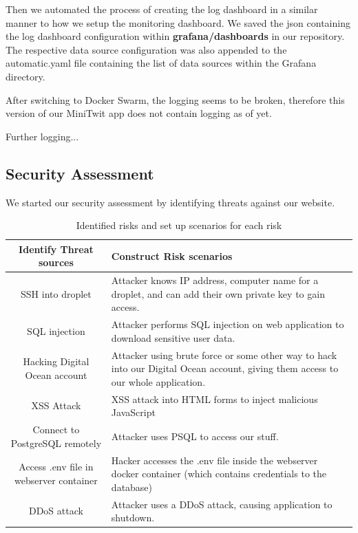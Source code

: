 Then we automated the process of creating the log dashboard in a similar manner to how we setup the monitoring dashboard. We saved the json containing the log dashboard configuration within \textbf{grafana/dashboards} in our repository. The respective data source configuration was also appended to the automatic.yaml file containing the list of data sources within the Grafana directory.

After switching to Docker Swarm, the logging seems to be broken, therefore this version of our MiniTwit app does not contain logging as of yet.

Further logging...

\subsection{Security Assessment}

We started our security assessment by identifying threats against our website.

\begin{table}[H]
    \centering
    \begin{tabular}{|c|p{6cm}|}
    \hline
        \textbf{Identify Threat sources} & \textbf{Construct Risk scenarios} \\ \hline
        SSH into droplet & Attacker knows IP address, computer name for a droplet, and can add their own private key to gain access.\\ \hline
        SQL injection & Attacker performs SQL injection on web application to download sensitive user data.\\ \hline
        Hacking Digital Ocean account & Attacker using brute force or some other way to hack into our Digital Ocean account, giving them access to our whole application.\\ \hline
        XSS Attack & XSS attack into HTML forms to inject malicious JavaScript\\ \hline
        Connect to PostgreSQL remotely & Attacker uses PSQL to access our stuff.\\ \hline
        Access .env file in webserver container & Hacker accesses the .env file inside the webserver docker container (which contains credentials to the database)\\ \hline
        DDoS attack & Attacker uses a DDoS attack, causing application to shutdown.\\ \hline
    \end{tabular}
    \caption{Identified risks and set up scenarios for each risk }
    \label{tab:my_label}
\end{table}

